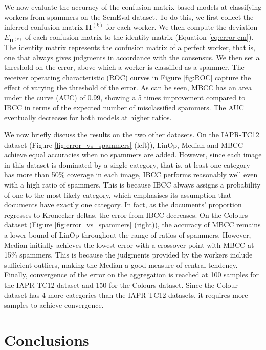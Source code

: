 \documentclass{article}
\begin{document}
We now evaluate the accuracy of the confusion matrix-based models
at classifying workers from spammers on the SemEval dataset. To do
this, we first collect the inferred confusion matrix $\boldsymbol{\Pi}^{(k)}$
for each worker. We then compute the deviation $E_{\mathbf{\Pi}^{(k)}}$
of each confusion matrix to the identity matrix (Equation \ref{eq:error-cm}).
The identity matrix represents the confusion matrix of a perfect worker,
that is, one that always gives judgments in accordance with the consensus.
We then set a threshold on the error, above which a worker is classified
as a spammer.    The receiver operating characteristic (ROC) curves
in Figure \ref{fig:ROC} capture the effect of varying the threshold
of the error. As can be seen, MBCC has an area under the curve (AUC)
of 0.99, showing a 5 times improvement compared to IBCC in terms
of the expected number of misclassified spammers.  The AUC eventually
decreases for both models at higher ratios. 

We now briefly discuss the results on the two other datasets. On
the IAPR-TC12 dataset (Figure \ref{fig:error_vs_spammers} (left)),
LinOp, Median and MBCC achieve equal accuracies when no spammers
are added. However, since each image in this dataset is dominated
by a single category, that is, at least one category has more than
50\% coverage in each image, IBCC performs reasonably well even with
a high ratio of spammers. This is because IBCC always assigns a
probability of one to the most likely category, which emphasises its
assumption that documents have exactly one category. In fact, as
the documents' proportion regresses to Kronecker deltas, the error
from IBCC decreases. On the Colours dataset (Figure \ref{fig:error_vs_spammers}
(right)), the accuracy of MBCC remains a lower bound of LinOp throughout
the range of ratios of spammers. However, Median initially achieves
the lowest error with a crossover point with MBCC at 15\% spammers.
This is because the judgments provided by the workers include sufficient
outliers, making the Median a good measure of central tendency.
Finally, convergence of the error on the aggregation is reached
at 100 samples for the IAPR-TC12 dataset and 150 for the Colours dataset.
Since the Colour dataset has 4 more categories than the IAPR-TC12
datasets, it requires more samples to achieve convergence.  






\section{Conclusions}
\end{document}
